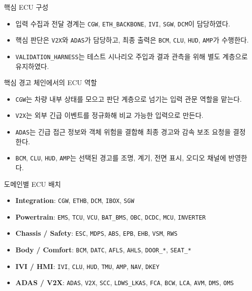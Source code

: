 \documentclass[aspectratio=169,10pt]{beamer}
\begin{document}
\begin{frame}{핵심 ECU 구성}
\begin{itemize}
  \item 입력 수집과 전달 경계는 \texttt{CGW}, \texttt{ETH\_BACKBONE}, \texttt{IVI}, \texttt{SGW}, \texttt{DCM}이 담당하였다.
  \item 핵심 판단은 \texttt{V2X}와 \texttt{ADAS}가 담당하고, 최종 출력은 \texttt{BCM}, \texttt{CLU}, \texttt{HUD}, \texttt{AMP}가 수행한다.
  \item \texttt{VALIDATION\_HARNESS}는 테스트 시나리오 주입과 결과 관측을 위해 별도 계층으로 유지하였다.
\end{itemize}
\end{frame}

\begin{frame}{핵심 경고 체인에서의 ECU 역할}
\begin{itemize}
  \item \texttt{CGW}는 차량 내부 상태를 모으고 판단 계층으로 넘기는 입력 관문 역할을 맡는다.
  \item \texttt{V2X}는 외부 긴급 이벤트를 정규화해 비교 가능한 입력으로 만든다.
  \item \texttt{ADAS}는 긴급 접근 정보와 객체 위험을 결합해 최종 경고와 감속 보조 요청을 결정한다.
  \item \texttt{BCM}, \texttt{CLU}, \texttt{HUD}, \texttt{AMP}는 선택된 경고를 조명, 계기, 전면 표시, 오디오 채널에 반영한다.
\end{itemize}
\end{frame}

\begin{frame}{도메인별 ECU 배치}
\begin{itemize}
  \item \textbf{Integration}: \texttt{CGW}, \texttt{ETHB}, \texttt{DCM}, \texttt{IBOX}, \texttt{SGW}
  \item \textbf{Powertrain}: \texttt{EMS}, \texttt{TCU}, \texttt{VCU}, \texttt{BAT\_BMS}, \texttt{OBC}, \texttt{DCDC}, \texttt{MCU}, \texttt{INVERTER}
  \item \textbf{Chassis / Safety}: \texttt{ESC}, \texttt{MDPS}, \texttt{ABS}, \texttt{EPB}, \texttt{EHB}, \texttt{VSM}, \texttt{RWS}
  \item \textbf{Body / Comfort}: \texttt{BCM}, \texttt{DATC}, \texttt{AFLS}, \texttt{AHLS}, \texttt{DOOR\_*}, \texttt{SEAT\_*}
  \item \textbf{IVI / HMI}: \texttt{IVI}, \texttt{CLU}, \texttt{HUD}, \texttt{TMU}, \texttt{AMP}, \texttt{NAV}, \texttt{DKEY}
  \item \textbf{ADAS / V2X}: \texttt{ADAS}, \texttt{V2X}, \texttt{SCC}, \texttt{LDWS\_LKAS}, \texttt{FCA}, \texttt{BCW}, \texttt{LCA}, \texttt{AVM}, \texttt{DMS}, \texttt{OMS}
\end{itemize}
\end{frame}
\end{document}

